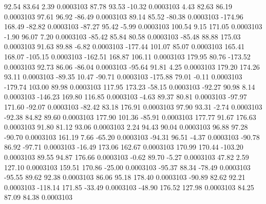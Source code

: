        92.54       83.64        2.39     0.0003103
       87.78       93.53      -10.32     0.0003103
        4.43       82.63       86.19     0.0003103
       97.61       96.92      -86.49     0.0003103
       89.14       85.52      -80.38     0.0003103
     -174.96      168.49      -82.82     0.0003103
      -87.27       95.42       -5.99     0.0003103
      100.54        9.15      171.05     0.0003103
       -1.90       96.07        7.20     0.0003103
      -85.42       85.84       80.58     0.0003103
      -85.48       88.88      175.03     0.0003103
       91.63       89.88       -6.82     0.0003103
     -177.44      101.07       85.07     0.0003103
      165.41      168.07     -105.15     0.0003103
     -162.51      168.87      106.11     0.0003103
      179.95       80.76     -173.52     0.0003103
       92.73       86.06      -86.04     0.0003103
      -95.64       91.81        4.25     0.0003103
      179.20      174.26       93.11     0.0003103
      -89.35       10.47      -90.71     0.0003103
     -175.88       79.01       -0.11     0.0003103
     -179.74      103.00       89.98     0.0003103
      117.95      173.23      -58.15     0.0003103
      -92.27       90.98        8.14     0.0003103
     -146.23      169.80      116.85     0.0003103
       -4.63       89.37       80.81     0.0003103
      -97.97      171.60      -92.07     0.0003103
      -82.42       83.18      176.91     0.0003103
       97.90       93.31       -2.74     0.0003103
      -92.38       84.82       89.60     0.0003103
      177.90      101.36      -85.91     0.0003103
      177.77       91.67      176.63     0.0003103
       91.80       81.12       93.06     0.0003103
        2.24       94.43       90.04     0.0003103
       96.88       97.28      -90.70     0.0003103
      161.19        7.66      -65.20     0.0003103
      -94.31       96.51       -4.37     0.0003103
      -90.78       86.92      -97.71     0.0003103
      -16.49      173.06      162.67     0.0003103
      170.99      170.44     -103.20     0.0003103
       89.55       94.87      176.66     0.0003103
       -0.62       89.70       -5.27     0.0003103
       47.82        2.59      127.10     0.0003103
      159.51      170.86      -25.00     0.0003103
      -95.37       88.34      -78.49     0.0003103
      -95.55       89.62       92.38     0.0003103
       86.06       95.18      178.40     0.0003103
      -90.89       82.62       92.21     0.0003103
     -118.14      171.85      -33.49     0.0003103
      -48.90      176.52      127.98     0.0003103
       84.25       87.09       84.38     0.0003103
